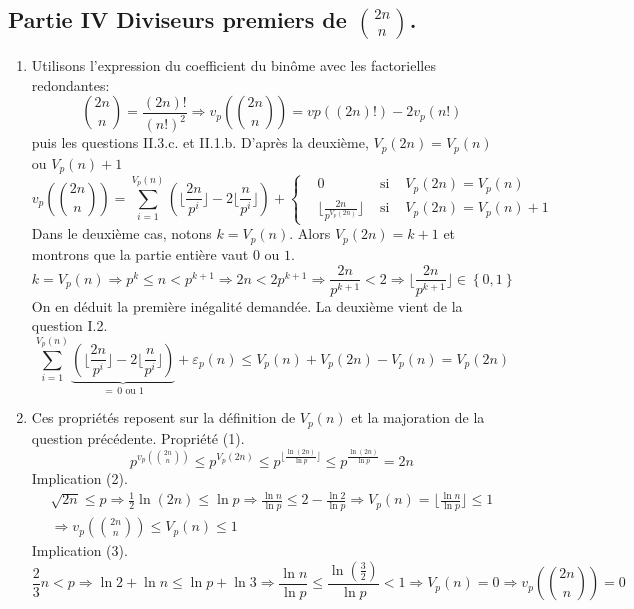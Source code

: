 \subsection*{Partie IV Diviseurs premiers de $\binom{2n}{n}$.}
\begin{enumerate}
  \item Utilisons l'expression du coefficient du binôme avec les factorielles redondantes:
\begin{displaymath}
\binom{2n}{n} = \frac{(2n)!}{(n!)^2} \Rightarrow v_p(\binom{2n}{n})= vp((2n)!) - 2v_p(n!)  
\end{displaymath}
puis les questions II.3.c. et II.1.b. D'après la deuxième, $V_p(2n)= V_p(n)$ ou $V_p(n)+1$
\begin{displaymath}
v_p(\binom{2n}{n}) = \sum_{i=1}^{V_p(n)}\left(\lfloor \frac{2n}{p^i}\rfloor - 2\lfloor \frac{n}{p^i}\rfloor\right)  
+ 
\left\lbrace 
\begin{aligned}
&0 &\text{ si } &V_p(2n) = V_p(n) \\
&\lfloor \frac{2n}{p^{V_p(2n)}}\rfloor &\text{ si } &V_p(2n) = V_p(n) +1
\end{aligned}
\right. 
\end{displaymath}
Dans le deuxième cas, notons $k=V_p(n)$. Alors $V_p(2n)= k +1$ et montrons que la partie entière vaut $0$ ou $1$.
\begin{displaymath}
  k=V_p(n) \Rightarrow p^k \leq n < p^{k+1} \Rightarrow 2n < 2p^{k+1} \Rightarrow \frac{2n}{p^{k+1}}<2 \Rightarrow \lfloor \frac{2n}{p^{k+1}} \rfloor \in \left\lbrace 0,1 \right\rbrace 
\end{displaymath}
On en déduit la première inégalité demandée. La deuxième vient de la question I.2. 
\begin{displaymath}
\sum_{i=1}^{V_p(n)}\underset{= \, 0 \text{ ou } 1}{\underbrace{\left(\lfloor \frac{2n}{p^i}\rfloor - 2\lfloor \frac{n}{p^i}\rfloor\right)}}
+\varepsilon_p(n)
\leq V_p(n) + V_p(2n) - V_p(n) = V_p(2n)
\end{displaymath}

  \item Ces propriétés reposent sur la définition de $V_p(n)$ et la majoration de la question précédente.
Propriété (1).
\begin{displaymath}
p^{v_p(\binom{2n}{n})} \leq p^{V_p(2n)} \leq p^{\lfloor \frac{\ln(2n)}{\ln p}\rfloor}
\leq p^{\frac{\ln(2n)}{\ln p}} = 2n
\end{displaymath}
Implication (2).
\begin{multline*}
\sqrt{2n}\leq p \Rightarrow \frac{1}{2}\ln(2n) \leq \ln p 
\Rightarrow \frac{\ln n}{\ln p}\leq 2 -\frac{\ln 2}{\ln p} \Rightarrow V_p(n) = \lfloor \frac{\ln n}{\ln p} \rfloor \leq 1 \\
\Rightarrow v_p(\binom{2n}{n})\leq V_p(n) \leq 1
\end{multline*}
Implication (3).
\begin{displaymath}
  \frac{2}{3}n < p \Rightarrow \ln 2 + \ln n \leq \ln p  + \ln 3
\Rightarrow \frac{\ln n}{\ln p} \leq \frac{\ln(\frac{3}{2})}{\ln p} < 1 
\Rightarrow V_p(n) = 0
\Rightarrow v_p(\binom{2n}{n}) = 0
\end{displaymath}
\end{enumerate}

